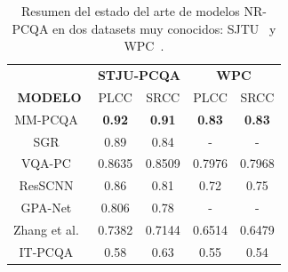 \begin{table}[htp]
    \tiny
    \centering
    \begin{tabular}{|c|c|c|c|c|}
        \hline
        \rowcolor[HTML]{FFC702}
        \cellcolor[HTML]{FFC702} & \multicolumn{2}{c|}{\cellcolor[HTML]{FFC702}\textbf{STJU-PCQA}} & \multicolumn{2}{c|}{\cellcolor[HTML]{FFC702}\textbf{WPC}} \\ 
        \cline{2-5}
       \multirow{-2}{*}{\cellcolor[HTML]{FFC702}\textbf{MODELO}}  &\multicolumn{1}{c|}{\cellcolor[HTML]{FFC702} PLCC} & \multicolumn{1}{c|}{\cellcolor[HTML]{FFC702}SRCC} & \multicolumn{1}{c|}{\cellcolor[HTML]{FFC702}PLCC} & \multicolumn{1}{c|}{\cellcolor[HTML]{FFC702}SRCC} \\
        \hline
       MM-PCQA~\cite{MM-PCQA} & \textbf{0.92} & \textbf{0.91} & \textbf{0.83} & \textbf{0.83}\\
        \hline
        SGR~\cite{SGR} & 0.89 & 0.84 & - & - \\
        \hline
        VQA-PC~\cite{VQA-PC} & 0.8635 & 0.8509 & 0.7976 & 0.7968\\
        \hline
        ResSCNN~\cite{ResSCNN} & 0.86 & 0.81 & 0.72 & 0.75\\
        \hline
        GPA-Net~\cite{GPA-NET} & 0.806 & 0.78 & - & - \\
        \hline
        Zhang et al.~\cite{NR3DQA}& 0.7382 & 0.7144 & 0.6514 & 0.6479\\
        \hline
        IT-PCQA~\cite{IT-PCQA}& 0.58 & 0.63 & 0.55  & 0.54\\
        \hline
    \end{tabular}
    \caption[Estado del arte de modelos NR-PCQA]{Resumen del estado del arte de modelos NR-PCQA en dos datasets muy conocidos: SJTU~\cite{SJTU} y WPC~\cite{WPC1,WPC2}.}
\end{table}

